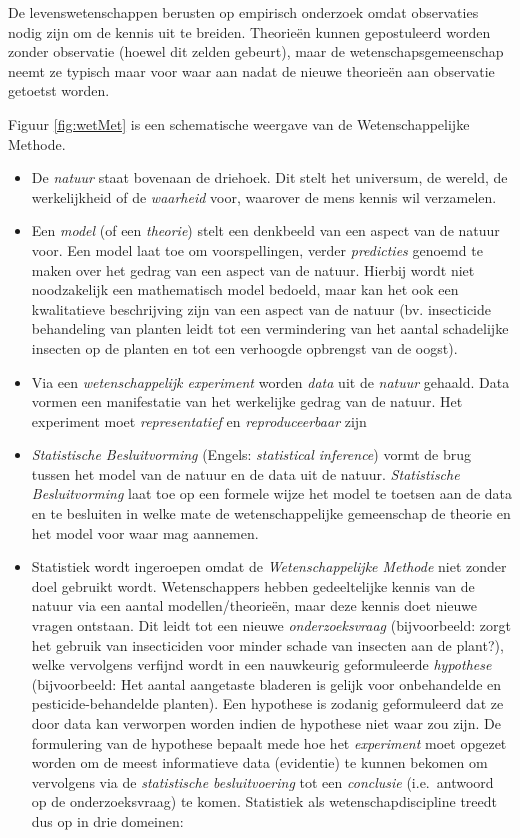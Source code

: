 \documentclass[
  12pt,dutch,coursenotes]{book}
\theoremstyle{definition}
\theoremstyle{definition}
\theoremstyle{definition}
\theoremstyle{definition}
\theoremstyle{remark}
\begin{document}
De levenswetenschappen berusten op empirisch onderzoek omdat observaties nodig zijn om de kennis uit te breiden. Theorieën kunnen gepostuleerd worden zonder observatie (hoewel dit zelden gebeurt), maar de wetenschapsgemeenschap neemt ze typisch maar voor waar aan nadat de nieuwe theorieën aan observatie getoetst worden.

Figuur \ref{fig:wetMet} is een schematische weergave van de Wetenschappelijke Methode.

\begin{itemize}
\item
  De \emph{natuur} staat bovenaan de driehoek. Dit stelt het universum, de wereld, de werkelijkheid of de \emph{waarheid} voor, waarover de mens kennis wil verzamelen.
\item
  Een \emph{model} (of een \emph{theorie}) stelt een denkbeeld van een aspect van de natuur voor. Een model laat toe om voorspellingen, verder \emph{predicties} genoemd te maken over het gedrag van een aspect van de natuur. Hierbij wordt niet noodzakelijk een mathematisch model bedoeld, maar kan het ook een kwalitatieve beschrijving zijn van een aspect van de natuur (bv. insecticide behandeling van planten leidt tot een vermindering van het aantal schadelijke insecten op de planten en tot een verhoogde opbrengst van de oogst).
\item
  Via een \emph{wetenschappelijk experiment} worden \emph{data} uit de \emph{natuur} gehaald. Data vormen een manifestatie van het werkelijke gedrag van de natuur. Het experiment moet \emph{representatief} en \emph{reproduceerbaar} zijn
\item
  \emph{Statistische Besluitvorming} (Engels: \emph{statistical inference}) vormt de brug tussen het model van de natuur en de data uit de natuur. \emph{Statistische Besluitvorming} laat toe op een formele wijze het model te toetsen aan de data en te besluiten in welke mate de wetenschappelijke gemeenschap de theorie en het model voor waar mag aannemen.
\item
  Statistiek wordt ingeroepen omdat de \emph{Wetenschappelijke Methode} niet zonder doel gebruikt wordt. Wetenschappers hebben gedeeltelijke kennis van de natuur via een aantal modellen/theorieën, maar deze kennis doet nieuwe vragen ontstaan. Dit leidt tot een nieuwe \emph{onderzoeksvraag} (bijvoorbeeld: zorgt het gebruik van insecticiden voor minder schade van insecten aan de plant?), welke vervolgens verfijnd wordt in een nauwkeurig geformuleerde \emph{hypothese} (bijvoorbeeld: Het aantal aangetaste bladeren is gelijk voor onbehandelde en pesticide-behandelde planten). Een hypothese is zodanig geformuleerd dat ze door data kan verworpen worden indien de hypothese niet waar zou zijn. De formulering van de hypothese bepaalt mede hoe het \emph{experiment} moet opgezet worden om de meest informatieve data (evidentie) te kunnen bekomen om vervolgens via de \emph{statistische besluitvoering} tot een \emph{conclusie} (i.e.~antwoord op de onderzoeksvraag) te komen. Statistiek als wetenschapdiscipline treedt dus op in drie domeinen:


\end{itemize}
\end{document}
